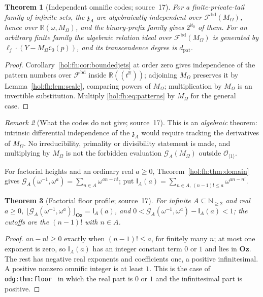 \documentclass[11pt]{article}
\numberwithin{equation}{section}
\newtheorem{theorem}{Theorem}[section]
\theoremstyle{definition}
\theoremstyle{remark}
\newtheorem{remark}[theorem]{Remark}
\newcommand{\R}{\mathbb R}
\newcommand{\N}{\mathbb N}
\newcommand{\Oz}{\mathbf{Oz}}
\begin{document}
\begin{theorem}[Independent omnific codes; source~17]\label{hol:fh:thm:codes}
For a finite-private-tail family of infinite sets, the $\mathfrak z_A$ are
algebraically independent over $\mathcal F^{\mathrm{bd}}(M_\Omega)$, hence over
$\R(\omega,M_\Omega)$, and the binary-prefix family gives $2^{\aleph_0}$ of
them. For an arbitrary finite family the algebraic relation ideal over
$\mathcal F^{\mathrm{bd}}(M_\Omega)$ is generated by $\boldsymbol\ell_j\cdot
(Y-M_\Omega\mathsf c_0(p))$, and its transcendence degree is $d_{\mathrm{pat}}$.
\end{theorem}

\begin{proof}
Corollary~\ref{hol:fh:cor:boundedjets} at order zero gives independence of the
pattern numbers over $\mathcal F^{\mathrm{bd}}$ inside $\R((t^\R))$; adjoining
$M_\Omega$ preserves it by Lemma~\ref{hol:fh:lem:scale}, comparing powers of
$M_\Omega$; multiplication by $M_\Omega$ is an invertible substitution. Multiply
\eqref{hol:fh:eq:patterns} by $M_\Omega$ for the general case.
\end{proof}

\begin{remark}[What the codes do not give; source~17]\label{hol:fh:rem:codes}
This is an \emph{algebraic} theorem: intrinsic differential independence of
the $\mathfrak z_A$ would require tracking the derivatives of $M_\Omega$. No
irreducibility, primality or divisibility statement is made, and multiplying
by $M_\Omega$ is not the forbidden evaluation $\mathcal G_A(M_\Omega)$ outside
$\mathcal O_{\langle1\rangle}$.
\end{remark}

For factorial heights and an ordinary real $a\ge0$,
Theorem~\ref{hol:fh:thm:domain} gives
$\mathcal G_A(\omega^{-1},\omega^a)=\sum_{n\in A}\omega^{an-n!}$; put
$\mathsf I_A(a)=\sum_{n\in A,\,(n-1)!\le a}\omega^{an-n!}$.

\begin{theorem}[Factorial floor profile; source~17]\label{hol:fh:thm:floor}
For infinite $A\subseteq\N_{\ge2}$ and real $a\ge0$,
$\lfloor\mathcal G_A(\omega^{-1},\omega^a)\rfloor_{\Oz}=\mathsf I_A(a)$, and
$0<\mathcal G_A(\omega^{-1},\omega^a)-\mathsf I_A(a)<1$; the cutoffs are the
$(n-1)!$ with $n\in A$.
\end{theorem}

\begin{proof}
$an-n!\ge0$ exactly when $(n-1)!\le a$, for finitely many $n$; at most one
exponent is zero, so $\mathsf I_A(a)$ has an integer constant term $0$ or $1$
and lies in $\Oz$. The rest has negative real exponents and coefficients one,
a positive infinitesimal. A positive nonzero omnific integer is at least $1$.
This is the case of \texttt{odg:thm:floor}~\cite{repoodg} in which the
real part is $0$ or $1$ and the infinitesimal part is positive.
\end{proof}
\end{document}

